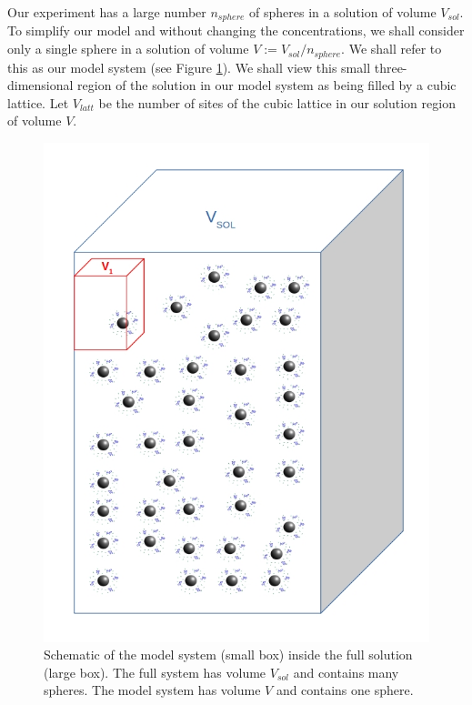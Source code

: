 \documentclass[journal=mamobx,manuscript=article]{achemso}
\begin{document}
Our experiment has a large number $n_{sphere}$ of spheres in a solution of volume $V_{sol}$.  
To simplify 
our model and without changing the concentrations, we shall consider only a single sphere in a solution
of volume $V:=V_{sol}/n_{sphere}$.  We shall refer to this as our model system (see Figure \ref{figure1volume}).
We shall view this small three-dimensional region of the solution in our model system as being filled by a 
cubic lattice.
Let $V_{latt}$ be the number of sites of the cubic 
lattice in our solution region of volume $V$.




 \begin{figure}[H] 
  \includegraphics[scale=0.5]{fig7.jpg}
\caption{Schematic of the model system (small box)
inside the full solution (large box). The full system
has volume $V_{sol}$ and contains many spheres.  The model
system has volume $V$ and contains one sphere.}
\label{figure1volume}
\end{figure}
\end{document}
